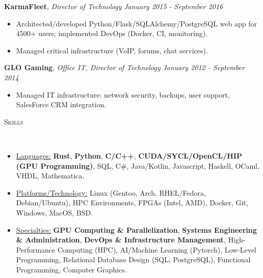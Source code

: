 \documentclass[8pt]{article}
\newenvironment{changemargin}[2]{%
  \begin{list}{}{%
    \setlength{\topsep}{0pt}%
    \setlength{\leftmargin}{#1}%
    \setlength{\rightmargin}{#2}%
    \setlength{\listparindent}{\parindent}%
    \setlength{\itemindent}{\parindent}%
    \setlength{\parsep}{0pt}%
    \setlength{\itemsep}{-2pt}%
  }%
  \item[]}{\end{list}
}
\newcommand{\lineover}{
	\begin{changemargin}{-0.05in}{-0.05in}
		\vspace*{-10pt}
		\hrulefill \\
		\vspace*{-4pt}
	\end{changemargin}
}
\newcommand{\header}[1]{
	\begin{changemargin}{-0.5in}{-0.5in}
		\scshape{#1}\\
  	\lineover
	\end{changemargin}
}
\newenvironment{body} {
	\vspace*{-10pt}
	\begin{changemargin}{-0.25in}{-0.5in}
  }	
	{\end{changemargin}
}
\begin{document}
\begin{body}
	\textbf{KarmaFleet}, \emph{Director of Technology} \hfill \emph{January 2015 - September 2016}\\
	\vspace*{-6pt}
	\begin{itemize} \itemsep -2pt
		\item Architected/developed Python/Flask/SQLAlchemy/PostgreSQL web app for 4500+ users; implemented DevOps (Docker, CI, monitoring).
		\item Managed critical infrastructure (VoIP, forums, chat services).
	\end{itemize}
	\vspace*{-6pt}

	\textbf{GLO Gaming}, \emph{Office IT, Director of Technology} \hfill \emph{January 2012 - September 2014}\\
	\vspace*{-6pt}
	\begin{itemize} \itemsep -2pt
		\item Managed IT infrastructure: network security, backups, user support, SalesForce CRM integration.
	\end{itemize}
	\vspace*{-6pt}

	\smallskip
	\vspace*{-11pt}
	\smallskip
\end{body}


\smallskip

\header{Skills}
\smallskip
\begin{body}
	\vspace{10pt}
	\begin{itemize} \itemsep -2pt
		\item \uline{Languages:} \textbf{Rust}, \textbf{Python}, \textbf{C/C++}, \textbf{CUDA/SYCL/OpenCL/HIP (GPU Programming)}, SQL, C\#, Java/Kotlin, Javascript, Haskell, OCaml, VHDL, Mathematica.
		\item \uline{Platforms/Technology:} Linux (Gentoo, Arch, RHEL/Fedora, Debian/Ubuntu), HPC Environments, FPGAs (Intel, AMD), Docker, Git, Windows, MacOS, BSD.
		\item \uline{Specialties:} \textbf{GPU Computing \& Parallelization}, \textbf{Systems Engineering \& Administration}, \textbf{DevOps \& Infrastructure Management}, High-Performance Computing (HPC), AI/Machine Learning (Pytorch), Low-Level Programming, Relational Database Design (SQL, PostgreSQL), Functional Programming, Computer Graphics.
	\end{itemize}
\end{body}
\end{document}
